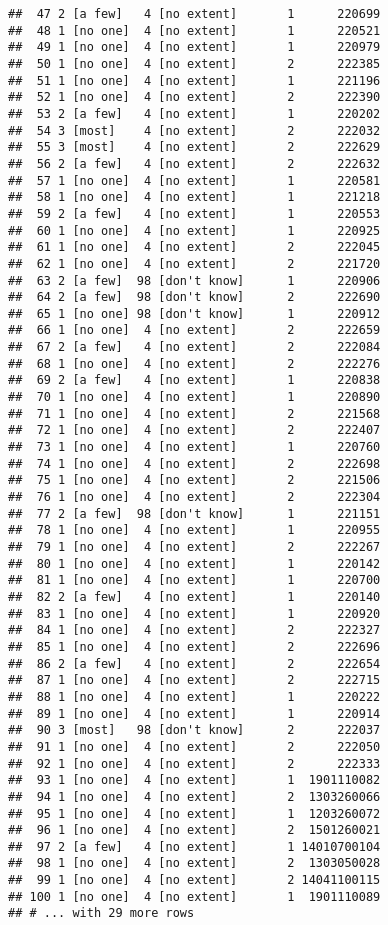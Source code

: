 \documentclass[]{article}
\begin{document}
\begin{verbatim}
##  47 2 [a few]   4 [no extent]       1      220699
##  48 1 [no one]  4 [no extent]       1      220521
##  49 1 [no one]  4 [no extent]       1      220979
##  50 1 [no one]  4 [no extent]       2      222385
##  51 1 [no one]  4 [no extent]       1      221196
##  52 1 [no one]  4 [no extent]       2      222390
##  53 2 [a few]   4 [no extent]       1      220202
##  54 3 [most]    4 [no extent]       2      222032
##  55 3 [most]    4 [no extent]       2      222629
##  56 2 [a few]   4 [no extent]       2      222632
##  57 1 [no one]  4 [no extent]       1      220581
##  58 1 [no one]  4 [no extent]       1      221218
##  59 2 [a few]   4 [no extent]       1      220553
##  60 1 [no one]  4 [no extent]       1      220925
##  61 1 [no one]  4 [no extent]       2      222045
##  62 1 [no one]  4 [no extent]       2      221720
##  63 2 [a few]  98 [don't know]      1      220906
##  64 2 [a few]  98 [don't know]      2      222690
##  65 1 [no one] 98 [don't know]      1      220912
##  66 1 [no one]  4 [no extent]       2      222659
##  67 2 [a few]   4 [no extent]       2      222084
##  68 1 [no one]  4 [no extent]       2      222276
##  69 2 [a few]   4 [no extent]       1      220838
##  70 1 [no one]  4 [no extent]       1      220890
##  71 1 [no one]  4 [no extent]       2      221568
##  72 1 [no one]  4 [no extent]       2      222407
##  73 1 [no one]  4 [no extent]       1      220760
##  74 1 [no one]  4 [no extent]       2      222698
##  75 1 [no one]  4 [no extent]       2      221506
##  76 1 [no one]  4 [no extent]       2      222304
##  77 2 [a few]  98 [don't know]      1      221151
##  78 1 [no one]  4 [no extent]       1      220955
##  79 1 [no one]  4 [no extent]       2      222267
##  80 1 [no one]  4 [no extent]       1      220142
##  81 1 [no one]  4 [no extent]       1      220700
##  82 2 [a few]   4 [no extent]       1      220140
##  83 1 [no one]  4 [no extent]       1      220920
##  84 1 [no one]  4 [no extent]       2      222327
##  85 1 [no one]  4 [no extent]       2      222696
##  86 2 [a few]   4 [no extent]       2      222654
##  87 1 [no one]  4 [no extent]       2      222715
##  88 1 [no one]  4 [no extent]       1      220222
##  89 1 [no one]  4 [no extent]       1      220914
##  90 3 [most]   98 [don't know]      2      222037
##  91 1 [no one]  4 [no extent]       2      222050
##  92 1 [no one]  4 [no extent]       2      222333
##  93 1 [no one]  4 [no extent]       1  1901110082
##  94 1 [no one]  4 [no extent]       2  1303260066
##  95 1 [no one]  4 [no extent]       1  1203260072
##  96 1 [no one]  4 [no extent]       2  1501260021
##  97 2 [a few]   4 [no extent]       1 14010700104
##  98 1 [no one]  4 [no extent]       2  1303050028
##  99 1 [no one]  4 [no extent]       2 14041100115
## 100 1 [no one]  4 [no extent]       1  1901110089
## # ... with 29 more rows
\end{verbatim}
\end{document}
